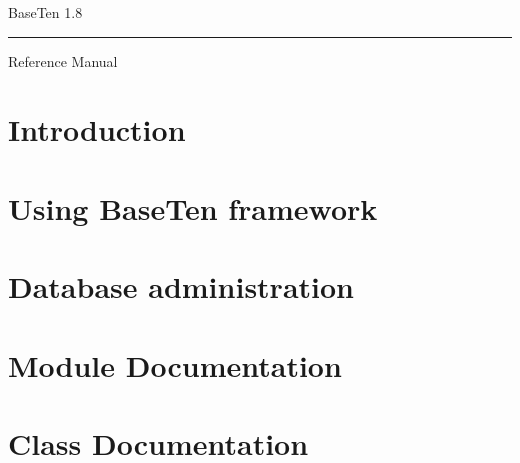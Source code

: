 \documentclass[a4paper]{book}
\begin{document}
\begin{titlepage}
\fontsize{40pt}{0pt}\selectfont
\vspace*{5cm}
\parbox{\columnwidth}{\raggedright{BaseTen 1.8}}
\rule{\columnwidth}{1pt}
\fontsize{18pt}{16pt}\selectfont
\parbox{\columnwidth}{\raggedright\hspace{1mm}Reference Manual}
\vfill
{}
\end{titlepage}

\clearemptydoublepage
{}
\tableofcontents
\clearemptydoublepage
{}

\chapter{Introduction}
\label{index}\hypertarget{index}{}
\chapter{Using Base\+Ten framework}
\label{general_usage}
\hypertarget{general_usage}{}

\chapter{Database administration}
\label{database_usage}
\hypertarget{database_usage}{}

\chapter{Module Documentation}





\chapter{Class Documentation}






























\end{document}
